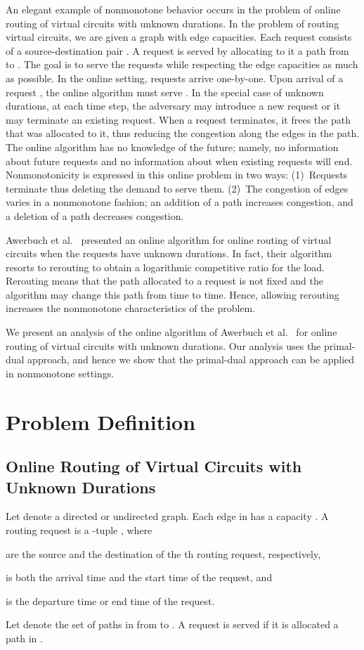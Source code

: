 \documentclass[11pt]{article}
\newenvironment{proof sketch}[1]{\noindent {\emph{Proof sketch of #1:}}}{\hfill \qed}
\begin{document}
An elegant example of nonmonotone behavior occurs in the problem of
online routing of virtual circuits with unknown durations. In the
problem of routing virtual circuits, we are given a graph with edge
capacities. Each request  consists of a
source-destination pair .  A request  is served by
allocating to it a path from  to . The goal is to serve the
requests while respecting the edge capacities as much as possible. In
the online setting, requests arrive one-by-one. Upon arrival of a
request , the online algorithm must serve . In the special
case of unknown durations, at each time step, the adversary may
introduce a new request or it may terminate an existing request.  When
a request terminates, it frees the path that was allocated to it, thus
reducing the congestion along the edges in the path.  The online
algorithm has no knowledge of the future; namely, no information about
future requests and no information about when existing requests will
end. Nonmonotonicity is expressed in this online problem in two ways:
(1)~Requests terminate thus deleting the demand to serve them. (2)~The
congestion of edges varies in a nonmonotone fashion; an addition of a
path increases congestion, and a deletion of a path decreases
congestion.

Awerbuch et al.~\cite{awerbuch2001competitive} presented an online
algorithm for online routing of virtual circuits when the requests
have unknown durations. In fact, their algorithm resorts to rerouting
to obtain a logarithmic competitive ratio for the load. Rerouting means
that the path allocated to a request is not fixed and the algorithm
may change this path from time to time. Hence, allowing rerouting
increases the nonmonotone characteristics of the problem.

We present an analysis of the online algorithm of Awerbuch et
al.~\cite{awerbuch2001competitive} for online routing of virtual circuits with
unknown durations. Our analysis uses the primal-dual approach, and hence
we show that the primal-dual approach can be applied in nonmonotone
settings.







\section{Problem Definition}
\subsection{Online Routing of Virtual Circuits with Unknown Durations}
Let  denote a directed or undirected graph.
Each edge  in  has a capacity .  A routing request  is a -tuple , where
\begin{inparaenum}[(i)]
\item
   are the source and the destination of the th
  routing request, respectively,
\item  is both the arrival time and the start time of the request, and
\item  is the departure time or end time of the request.
\end{inparaenum}
Let  denote the set of paths in  from  to .
A request  is served if it is allocated  a path in .
\end{document}
